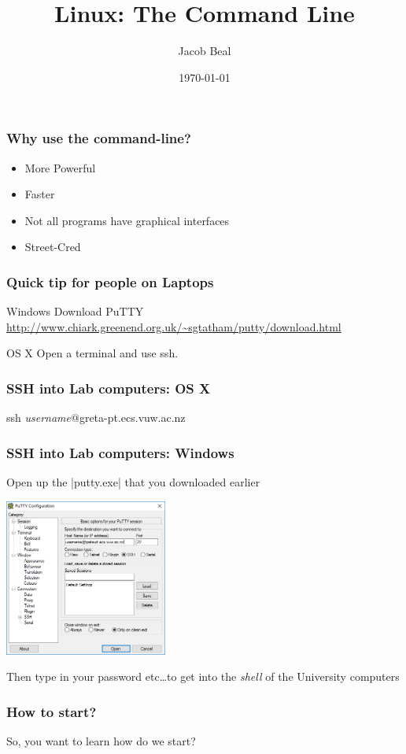 \documentclass{beamer}
\title[Learning Linux]{Linux: The Command Line}
\author{Jacob Beal}
\date{\today}
\begin{document}
\frame{\titlepage}
\begin{frame}
    \frametitle{Why use the command-line?}
    \begin{itemize}
        \item<1-> More Powerful
        \item<2-> Faster
        \item<3-> Not all programs have graphical interfaces
        \item<4-> Street-Cred
    \end{itemize}
\end{frame}
\begin{frame}
    \frametitle{Quick tip for people on Laptops}
    \begin{block}{Windows}
    Download PuTTY \url{http://www.chiark.greenend.org.uk/~sgtatham/putty/download.html}
    \end{block}
    \begin{block}{OS X}
    Open a terminal and use ssh.
    \end{block}
\end{frame}
\begin{frame}
    \frametitle{SSH into Lab computers: OS X}
\begin{semiverbatim}
    ssh \textit{username}@greta-pt.ecs.vuw.ac.nz
\end{semiverbatim}
\end{frame}
\begin{frame}
    \frametitle{SSH into Lab computers: Windows}
    Open up the \verbatim|putty.exe| that you downloaded earlier
    \begin{center}
        \includegraphics[width=0.4\textwidth]{putty}
    \end{center}
    Then type in your password etc\ldots to get into the \textit{shell} of the
    University computers
\end{frame}
\begin{frame}
    \frametitle{How to start?}
    So, you want to learn how do we start?
\end{frame}
\end{document}

